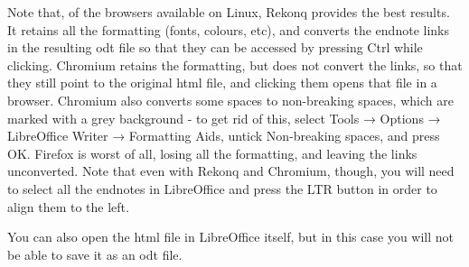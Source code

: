 \documentclass[a4paper,10pt, oneside]{book}
\begin{document}
Note that, of the browsers available on Linux, Rekonq provides the best results. It retains all the formatting (fonts, colours, etc), and converts the endnote links in the resulting odt file so that they can be accessed by pressing Ctrl while clicking. Chromium retains the formatting, but does not convert the links, so that they still point to the original html file, and clicking them opens that file in a browser. Chromium also converts some spaces to non-breaking spaces, which are marked with a grey background - to get rid of this, select Tools → Options → LibreOffice Writer → Formatting Aids, untick Non-breaking spaces, and press OK. Firefox is worst of all, losing all the formatting, and leaving the links unconverted. Note that even with Rekonq and Chromium, though, you will need to select all the endnotes in LibreOffice and press the LTR button in order to align them to the left.

You can also open the html file in LibreOffice itself, but in this case you will not be able to save it as an odt file. 


\newpage

\renewcommand{\bibname}{References}




\newpage

\appendix  %


% 


\newpage


% 


\newpage





\newpage


% 

% 
\end{document}
